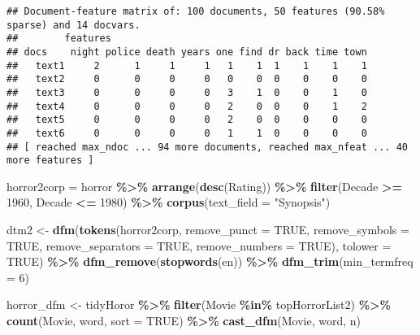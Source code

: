\documentclass[
]{article}
\newenvironment{Shaded}{\begin{snugshade}}{\end{snugshade}}
\newcommand{\AttributeTok}[1]{\textcolor[rgb]{0.13,0.29,0.53}{#1}}
\newcommand{\ConstantTok}[1]{\textcolor[rgb]{0.56,0.35,0.01}{#1}}
\newcommand{\DecValTok}[1]{\textcolor[rgb]{0.00,0.00,0.81}{#1}}
\newcommand{\FunctionTok}[1]{\textcolor[rgb]{0.13,0.29,0.53}{\textbf{#1}}}
\newcommand{\NormalTok}[1]{#1}
\newcommand{\OtherTok}[1]{\textcolor[rgb]{0.56,0.35,0.01}{#1}}
\newcommand{\SpecialCharTok}[1]{\textcolor[rgb]{0.81,0.36,0.00}{\textbf{#1}}}
\newcommand{\StringTok}[1]{\textcolor[rgb]{0.31,0.60,0.02}{#1}}
\begin{document}
\begin{verbatim}
## Document-feature matrix of: 100 documents, 50 features (90.58% sparse) and 14 docvars.
##        features
## docs    night police death years one find dr back time town
##   text1     2      1     1     1   1    1  1    1    1    1
##   text2     0      0     0     0   0    0  0    0    0    0
##   text3     0      0     0     0   3    1  0    0    1    0
##   text4     0      0     0     0   2    0  0    0    1    2
##   text5     0      0     0     0   2    0  0    0    0    0
##   text6     0      0     0     0   1    1  0    0    0    0
## [ reached max_ndoc ... 94 more documents, reached max_nfeat ... 40 more features ]
\end{verbatim}

\begin{Shaded}
\begin{Highlighting}[]
\NormalTok{horror2corp }\OtherTok{=}\NormalTok{ horror }\SpecialCharTok{\%\textgreater{}\%} 
  \FunctionTok{arrange}\NormalTok{(}\FunctionTok{desc}\NormalTok{(Rating)) }\SpecialCharTok{\%\textgreater{}\%} 
  \FunctionTok{filter}\NormalTok{(Decade }\SpecialCharTok{\textgreater{}=} \DecValTok{1960}\NormalTok{, Decade }\SpecialCharTok{\textless{}=} \DecValTok{1980}\NormalTok{) }\SpecialCharTok{\%\textgreater{}\%} 
  \FunctionTok{corpus}\NormalTok{(}\AttributeTok{text\_field =} \StringTok{"Synopsis"}\NormalTok{)}

\NormalTok{dtm2 }\OtherTok{\textless{}{-}} \FunctionTok{dfm}\NormalTok{(}\FunctionTok{tokens}\NormalTok{(horror2corp, }\AttributeTok{remove\_punct =} \ConstantTok{TRUE}\NormalTok{, }
                  \AttributeTok{remove\_symbols =} \ConstantTok{TRUE}\NormalTok{, }
                  \AttributeTok{remove\_separators =} \ConstantTok{TRUE}\NormalTok{, }\AttributeTok{remove\_numbers =} \ConstantTok{TRUE}\NormalTok{), }\AttributeTok{tolower =} \ConstantTok{TRUE}\NormalTok{) }\SpecialCharTok{\%\textgreater{}\%}
  \FunctionTok{dfm\_remove}\NormalTok{(}\FunctionTok{stopwords}\NormalTok{(}\StringTok{\textquotesingle{}en\textquotesingle{}}\NormalTok{)) }\SpecialCharTok{\%\textgreater{}\%} 
  \FunctionTok{dfm\_trim}\NormalTok{(}\AttributeTok{min\_termfreq =} \DecValTok{6}\NormalTok{)}


\NormalTok{horror\_dfm }\OtherTok{\textless{}{-}}\NormalTok{ tidyHoror }\SpecialCharTok{\%\textgreater{}\%}  
  \FunctionTok{filter}\NormalTok{(Movie }\SpecialCharTok{\%in\%}\NormalTok{ topHorrorList2) }\SpecialCharTok{\%\textgreater{}\%}
  \FunctionTok{count}\NormalTok{(Movie, word, }\AttributeTok{sort =} \ConstantTok{TRUE}\NormalTok{) }\SpecialCharTok{\%\textgreater{}\%} 
  \FunctionTok{cast\_dfm}\NormalTok{(Movie, word, n)}
\end{Highlighting}
\end{Shaded}
\end{document}
